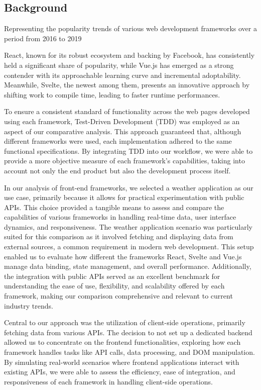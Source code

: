 \subsection*{Background}

Representing the popularity trends of various web development frameworks over a period from 2016 to 2019

React, known for its robust ecosystem and backing by Facebook, has consistently held a significant share of popularity, while Vue.js has emerged as a strong contender with its approachable learning curve and incremental adoptability. Meanwhile, Svelte, the newest among them, presents an innovative approach by shifting work to compile time, leading to faster runtime performances.

To ensure a consistent standard of functionality across the web pages developed using each framework, Test-Driven Development (TDD) was employed as an aspect of our comparative analysis. This approach guaranteed that, although different frameworks were used, each implementation adhered to the same functional specifications. By integrating TDD into our workflow, we were able to provide a more objective measure of each framework's capabilities, taking into account not only the end product but also the development process itself.

In our analysis of front-end frameworks, we selected a weather application as our use case, primarily because it allows for practical experimentation with public APIs. This choice provided a tangible means to assess and compare the capabilities of various frameworks in handling real-time data, user interface dynamics, and responsiveness. The weather application scenario was particularly suited for this comparison as it involved fetching and displaying data from external sources, a common requirement in modern web development. This setup enabled us to evaluate how different the frameworks React, Svelte and Vue.js manage data binding, state management, and overall performance. Additionally, the integration with public APIs served as an excellent benchmark for understanding the ease of use, flexibility, and scalability offered by each framework, making our comparison comprehensive and relevant to current industry trends.

Central to our approach was the utilization of client-side operations, primarily fetching data from various APIs. The decision to not set up a dedicated backend allowed us to concentrate on the frontend functionalities, exploring how each framework handles tasks like API calls, data processing, and DOM manipulation. By simulating real-world scenarios where frontend applications interact with existing APIs, we were able to assess the efficiency, ease of integration, and responsiveness of each framework in handling client-side operations.

